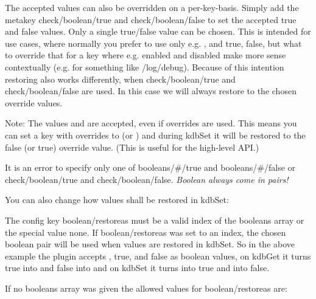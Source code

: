 The accepted values can also be overridden on a per-\/key-\/basis. Simply add the metakey {\ttfamily check/boolean/true} and {\ttfamily check/boolean/false} to set the accepted true and false values. Only a single true/false value can be chosen. This is intended for use cases, where normally you prefer to use only e.\+g. {}, {} and {\ttfamily true}, {\ttfamily false}, but what to override that for a key where e.\+g. {\ttfamily enabled} and {\ttfamily disabled} make more sense contextually (e.\+g. for something like {\ttfamily /log/debug}). Because of this intention restoring also works differently, when {\ttfamily check/boolean/true} and {\ttfamily check/boolean/false} are used. In this case we will always restore to the chosen override values.

Note\+: The values {} and {} are accepted, even if overrides are used. This means you can set a key with overrides to {} (or {}) and during {\ttfamily kdb\+Set} it will be restored to the false (or true) override value. (This is useful for the high-\/level A\+PI.)

It is an error to specify only one of {\ttfamily booleans/\#/true} and {\ttfamily booleans/\#/false} or {\ttfamily check/boolean/true} and {\ttfamily check/boolean/false}. {\itshape Boolean always come in pairs!}

You can also change how values shall be restored in {\ttfamily kdb\+Set}\+:


\begin{DoxyCode}{0}
\end{DoxyCode}


The config key {\ttfamily boolean/restoreas} must be a valid index of the {\ttfamily booleans} array or the special value {\ttfamily none}. If {\ttfamily boolean/restoreas} was set to an index, the chosen boolean pair will be used when values are restored in {\ttfamily kdb\+Set}. So in the above example the plugin accepts {}, {\ttfamily true}, {} and {\ttfamily false} as boolean values, on {\ttfamily kdb\+Get} it turns {\ttfamily true} into {} and {\ttfamily false} into {} and on {\ttfamily kdb\+Set} it turns {} into {\ttfamily true} and {} into {\ttfamily false}.

If no {\ttfamily booleans} array was given the allowed values for {\ttfamily boolean/restoreas} are\+:


